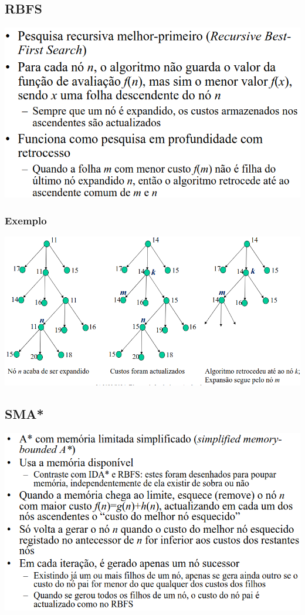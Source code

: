\documentclass{article}
\begin{document}
\subsection{RBFS}

\includegraphics[scale=0.35]{59}

\subsubsection{Exemplo}

\begin{center}
  \includegraphics[scale=0.35]{60}
\end{center}

\pagebreak

\subsection{SMA*}

\includegraphics[scale=0.35]{61}
\end{document}
